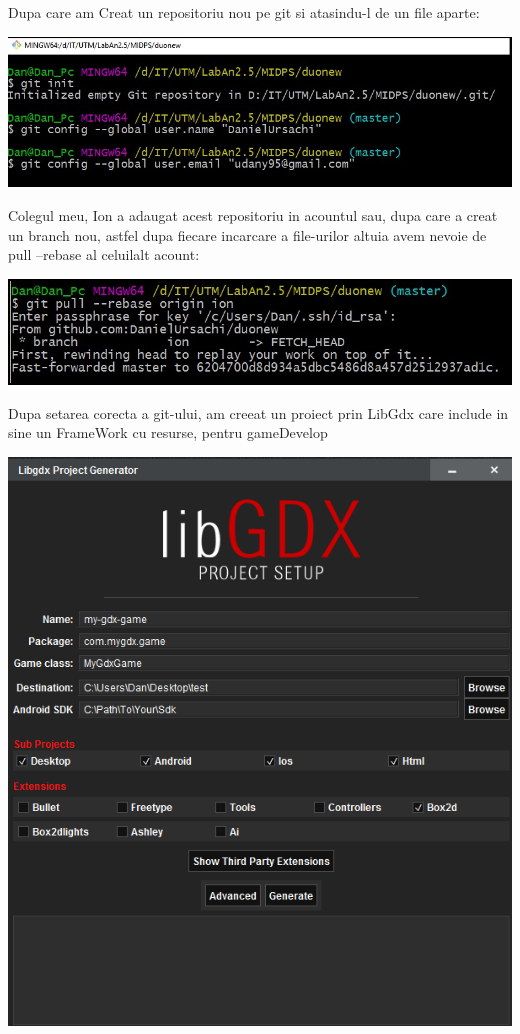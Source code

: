 Dupa care am Creat un repositoriu nou pe git si atasindu-l de un file aparte:
\begin{center}
\includegraphics[width=0.7\linewidth]{screenshot001}
\end{center}

Colegul meu, Ion a adaugat acest repositoriu in acountul sau, dupa care a creat un branch nou, astfel dupa fiecare incarcare a file-urilor altuia avem nevoie de pull --rebase al celuilalt acount:
\begin{center}
\includegraphics[width=0.7\linewidth]{screenshot002}
\end{center}

Dupa setarea corecta a git-ului, am creeat un proiect prin LibGdx care include in sine un FrameWork cu resurse, pentru gameDevelop
\begin{center}
\includegraphics[width=0.7\linewidth]{screenshot003}
\end{center}

